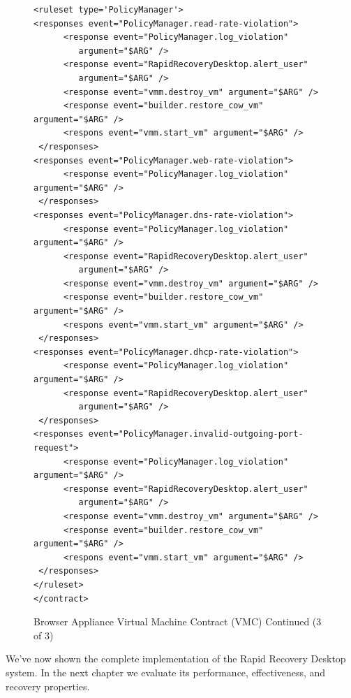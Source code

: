 \begin{figure}[tbp]
\caption{Browser Appliance Virtual Machine Contract (VMC) Continued (3 of 3)}
\label{lst:browser-appliance-cont2}

\begin{lstlisting}
<ruleset type='PolicyManager'>
<responses event="PolicyManager.read-rate-violation">
      <response event="PolicyManager.log_violation" 
         argument="$ARG" />
      <response event="RapidRecoveryDesktop.alert_user"
         argument="$ARG" />      
      <response event="vmm.destroy_vm" argument="$ARG" />
      <response event="builder.restore_cow_vm" argument="$ARG" />
      <respons event="vmm.start_vm" argument="$ARG" />
 </responses>
<responses event="PolicyManager.web-rate-violation">
      <response event="PolicyManager.log_violation" argument="$ARG" />
 </responses>
<responses event="PolicyManager.dns-rate-violation">
      <response event="PolicyManager.log_violation" argument="$ARG" />
      <response event="RapidRecoveryDesktop.alert_user" 
         argument="$ARG" />      
      <response event="vmm.destroy_vm" argument="$ARG" />
      <response event="builder.restore_cow_vm" argument="$ARG" />
      <respons event="vmm.start_vm" argument="$ARG" />
 </responses>
<responses event="PolicyManager.dhcp-rate-violation">
      <response event="PolicyManager.log_violation" argument="$ARG" />
      <response event="RapidRecoveryDesktop.alert_user" 
         argument="$ARG" />      
 </responses>
<responses event="PolicyManager.invalid-outgoing-port-request">
      <response event="PolicyManager.log_violation" argument="$ARG" />
      <response event="RapidRecoveryDesktop.alert_user" 
         argument="$ARG" />      
      <response event="vmm.destroy_vm" argument="$ARG" />
      <response event="builder.restore_cow_vm" argument="$ARG" />
      <respons event="vmm.start_vm" argument="$ARG" />
 </responses>
</ruleset>
</contract>
\end{lstlisting}
\end{figure}

We've now shown the complete implementation of the Rapid Recovery Desktop system. In the next chapter we evaluate its performance, effectiveness, and recovery properties.


